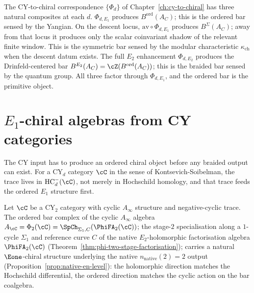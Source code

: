 \begin{remark}
\label{rem:three-bars-vol3}
The CY-to-chiral correspondence $\{\Phi_d\}$ of
Chapter~\ref{ch:cy-to-chiral} has three natural composites at each
$d$. $\Phi_{d,E_1}$ produces $B^{\mathrm{ord}}(A_C)$; this is the
ordered bar sensed by the Yangian. On the descent locus,
$\mathrm{av} \circ \Phi_{d,E_1}$ produces $B^{\Sigma}(A_C)$; away from
that locus it produces only the scalar coinvariant shadow of the
relevant finite window. This is the symmetric bar sensed by the
modular characteristic $\kappa_{\mathrm{ch}}$ when the descent datum
exists. The full $E_2$ enhancement $\Phi_{d,E_2}$ produces the
Drinfeld-centered bar
$B^{E_2}(A_C) = \cZ(B^{\mathrm{ord}}(A_C))$; this is the braided bar
sensed by the quantum group. All three factor through $\Phi_{d,E_1}$,
and the ordered bar is the primitive object.
\end{remark}

\section{\texorpdfstring{$E_1$}{E-1}-chiral algebras from CY categories}
\label{sec:e1-from-cy}

The CY input has to produce an ordered chiral object before any braided output can exist. For a CY$_d$ category $\cC$ in the sense of Kontsevich-Soibelman, the trace lives in $\mathrm{HC}^-_d(\cC)$, not merely in Hochschild homology, and that trace feeds the ordered $E_1$ structure first.

\begin{proposition}[\texorpdfstring{$E_1$}{E-1} sector at \texorpdfstring{$d=2$}{d=2}]
\label{prop:e1-sector-d2}
Let $\cC$ be a CY$_2$ category with cyclic $A_\infty$ structure and negative-cyclic trace. The ordered bar complex of the cyclic $A_\infty$ algebra $A_\cC = \Phi_2(\cC) = \SpCh_{\Sigma_1, C}(\PhiFA_2(\cC))$; the stage-$2$ specialisation along a $1$-cycle $\Sigma_1$ and reference curve $C$ of the native $E_2$-holomorphic factorisation algebra $\PhiFA_2(\cC)$ (Theorem~\ref{thm:phi-two-stage-factorisation}); carries a natural $\Eone$-chiral structure underlying the native $n_{\mathrm{native}}(2) = 2$ output (Proposition~\ref{prop:native-en-level}): the holomorphic direction matches the Hochschild differential, the ordered direction matches the cyclic action on the bar coalgebra.
\end{proposition}

